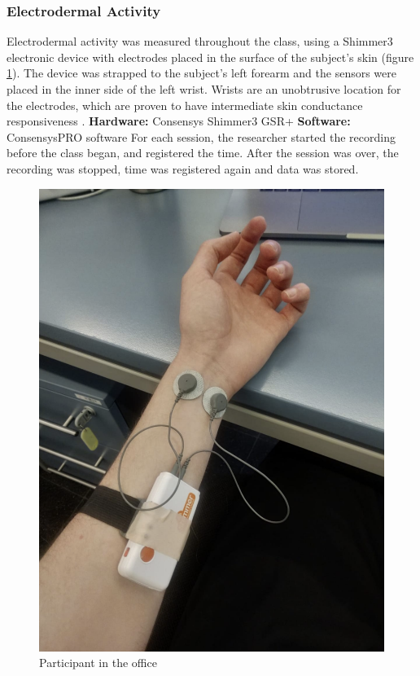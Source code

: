 \subsubsection{Electrodermal Activity}
Electrodermal activity was measured throughout the class, using a Shimmer3 electronic device with electrodes placed in the surface of the subject's skin (figure \ref{fig:shimmer}). The device was strapped to the subject's left forearm and the sensors were placed in the inner side of the left wrist. Wrists are an unobtrusive location for the electrodes, which are proven to have intermediate skin conductance responsiveness \cite{vandooren_de}.
\textbf{Hardware:} Consensys Shimmer3 GSR+
\textbf{Software:} ConsensysPRO software \cite{shimmer}
For each session, the researcher started the recording before the class began, and registered the time. After the session was over, the recording was stopped, time was registered again and data was stored.
\begin{figure}[!h]
    \includegraphics[clip,width=\columnwidth]{Figures/shimmer.png}%
\caption{Participant in the office}
\label{fig:shimmer}
\end{figure}
